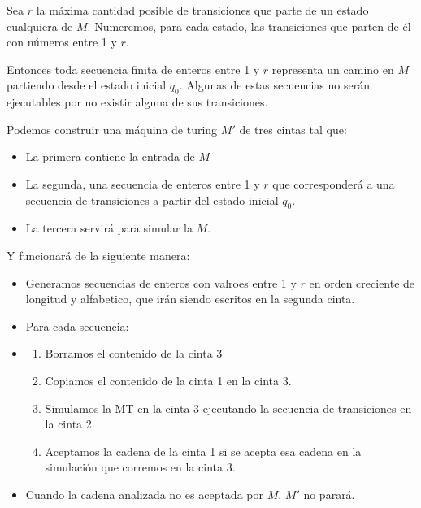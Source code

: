 \begin{demo}[0.8\textwidth]
  Sea \(r\) la máxima cantidad posible de transiciones que parte de un estado cualquiera de \(M\). Numeremos, para cada estado, las transiciones que parten de él con números entre 1 y \(r\).

  Entonces toda secuencia finita de enteros entre 1 y \(r\) representa un camino en \(M\) partiendo desde el estado inicial \(q_0\). Algunas de estas secuencias no serán ejecutables por no existir alguna de sus transiciones.

  Podemos construir una máquina de turing \(M'\) de tres cintas tal que:
  \begin{itemize}
    \item La primera contiene la entrada de \(M\)
    \item La segunda, una secuencia de enteros entre 1 y \(r\) que corresponderá a una secuencia de transiciones a partir del estado inicial \(q_0\).
    \item La tercera servirá para simular la \(M\).
  \end{itemize}
  Y funcionará de la siguiente manera:
  \begin{itemize}
    \item Generamos secuencias de enteros con valroes entre 1 y \(r\) en orden creciente de longitud y alfabetico, que irán siendo escritos en la segunda cinta.
    \item Para cada secuencia:
  \end{itemize}
\end{demo}
\begin{demoPart}[0.8\textwidth]
  \begin{itemize}
    \item[]
      \begin{enumerate}
        \item Borramos el contenido de la cinta 3
        \item Copiamos el contenido de la cinta 1 en la cinta 3.
        \item Simulamos la MT en la cinta 3 ejecutando la secuencia de transiciones en la cinta 2.
        \item Aceptamos la cadena de la cinta 1 si se acepta esa cadena en la simulación que corremos en la cinta 3.
      \end{enumerate}
    \item Cuando la cadena analizada no es aceptada por \(M\), \(M'\) no parará.
  \end{itemize}
\end{demoPart}

